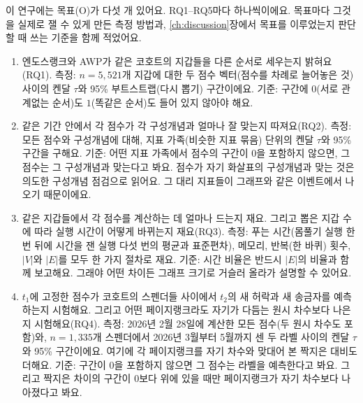 
이 연구에는 목표(O)가 다섯 개 있어요. RQ1--RQ5마다 하나씩이에요. 목표마다 그것을 실제로 잴 수 있게 만든 측정 방법과, \ref{ch:discussion}장에서 목표를 이루었는지 판단할 때 쓰는 기준을 함께 적었어요.

\begin{enumerate}
\item[O1.] 엔도스랭크와 AWP가 같은 코호트의 지갑들을 다른 순서로 세우는지 밝혀요(RQ1). 측정: $n=5{,}521$개 지갑에 대한 두 점수 벡터(점수를 차례로 늘어놓은 것) 사이의 켄달 $\tau$와 95\% 부트스트랩(다시 뽑기) 구간이에요. 기준: 구간에 $0$(서로 관계없는 순서)도 $1$(똑같은 순서)도 들어 있지 않아야 해요.
\item[O2.] 같은 기간 안에서 각 점수가 각 구성개념과 얼마나 잘 맞는지 따져요(RQ2). 측정: 모든 점수와 구성개념에 대해, 지표 가족(비슷한 지표 묶음) 단위의 켄달 $\tau$와 95\% 구간을 구해요. 기준: 어떤 지표 가족에서 점수의 구간이 $0$을 포함하지 않으면, 그 점수는 그 구성개념과 맞는다고 봐요. 점수가 자기 화살표의 구성개념과 맞는 것은 의도한 구성개념 점검으로 읽어요. 그 대리 지표들이 그래프와 같은 이벤트에서 나오기 때문이에요.
\item[O3.] 같은 지갑들에서 각 점수를 계산하는 데 얼마나 드는지 재요. 그리고 뽑은 지갑 수에 따라 실행 시간이 어떻게 바뀌는지 재요(RQ3). 측정: 푸는 시간(몸풀기 실행 한 번 뒤에 시간을 잰 실행 다섯 번의 평균과 표준편차), 메모리, 반복(한 바퀴) 횟수, $|V|$와 $|E|$를 모두 한 가지 절차로 재요. 기준: 시간 비율은 반드시 $|E|$의 비율과 함께 보고해요. 그래야 어떤 차이든 그래프 크기로 거슬러 올라가 설명할 수 있어요.
\item[O4.] $t_1$에 고정한 점수가 코호트의 스펜더들 사이에서 $t_2$의 새 허락과 새 송금자를 예측하는지 시험해요. 그리고 어떤 페이지랭크라도 자기가 다듬는 원시 차수보다 나은지 시험해요(RQ4). 측정: 2026년 2월 28일에 계산한 모든 점수(두 원시 차수도 포함)와, $n=1{,}335$개 스펜더에서 2026년 3월부터 5월까지 센 두 라벨 사이의 켄달 $\tau$와 95\% 구간이에요. 여기에 각 페이지랭크를 자기 차수와 맞대어 본 짝지은 대비도 더해요. 기준: 구간이 $0$을 포함하지 않으면 그 점수는 라벨을 예측한다고 봐요. 그리고 짝지은 차이의 구간이 $0$보다 위에 있을 때만 페이지랭크가 자기 차수보다 나아졌다고 봐요.

\end{enumerate}
